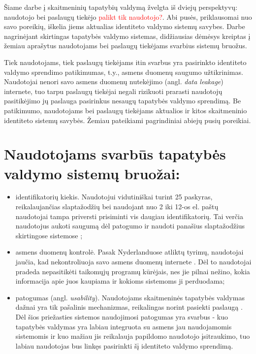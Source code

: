 Šiame darbe į skaitmeninių tapatybių valdymą žvelgta iš dviejų perspektyvų: naudotojo bei paslaugų tiekėjo \textcolor{red}{palikt tik naudotojo?}. Abi pusės,
priklausomai nuo savo poreikių, iškelia jiems aktualias identiteto valdymo sistemų savybes. Darbe nagrinėjant skirtingas tapatybės valdymo sistemas,
didžiausias dėmėsys kreiptas į žemiau aprašytus naudotojams bei paslaugų tiekėjams svarbius sistemų bruožus.

Tiek naudotojams, tiek paslaugų tiekėjams itin svarbus yra pasirinkto identiteto valdymo sprendimo patikimumas, t.y., asmens duomenų saugumo užtikrinimas.
Naudotojai nenori savo asmens duomenų nutekėjimo (angl. \textit{data leakage}) internete, tuo tarpu paslaugų tiekėjai negali rizikuoti prarasti naudotojų pasitikėjimo
jų paslauga pasirinkus nesaugų tapatybės valdymo sprendimą. Be patikimumo, naudotojams bei paslaugų tiekėjams aktualios ir 
kitos skaitmeninio identiteto sistemų savybės. Žemiau pateikiami pagrindiniai abiejų pusių poreikiai.
\\

\chapter{\textbf{Naudotojams svarbūs tapatybės valdymo sistemų bruožai:}}

\begin{itemize}
    \item identifikatorių kiekis. Naudotojui vidutiniškai turint 25 paskyras, reikalaujančias slaptažodžių \cite{Florencio2007} bei naudojant
    nuo 2 iki 12-os el. paštų \cite{Gross2007} naudotojai tampa priversti prisiminti vis daugiau identifikatorių. Tai verčia naudotojus aukoti saugumą dėl patogumo ir naudoti panašius
    slaptažodžius skirtingose sistemose \cite{Pashalidis2003, Samar1999};
    \item asmens duomenų kontrolė. Pasak Nyderlanduose atliktų tyrimų, naudotojai jaučia, kad nekontroliuoja savo asmens duomenų internete \cite{Baars2016}. Dėl to
    naudotojai pradeda nepasitikėti taikomųjų programų kūrėjais, nes jie pilnai nežino, kokia informacija apie juos kaupiama ir kokioms
    sistemoms ji perduodama;
    \item patogumas (angl. \textit{usability}). Naudotojams skaitmeninės tapatybės valdymas dažnai yra tik pašalinis mechanizmas, reikalingas
    norint pasiekti paslaugą \cite{Dhamija2008}. Dėl šios priežasties sistemos naudojimosi patogumas yra svarbus - kuo tapatybės valdymas yra labiau integruota
    su asmens jau naudojamomis sistemomis ir kuo mažiau jis reikalauja papildomo naudotojo įsitraukimo, tuo labiau naudotojas bus linkęs pasirinkti šį identiteto valdymo sprendimą.
\end{itemize}


